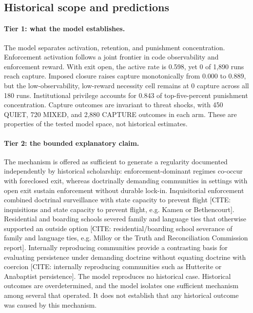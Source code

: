 \documentclass[12pt]{article}
\begin{document}
\subsection{Historical scope and predictions}

\paragraph{Tier 1: what the model establishes.}
The model separates activation, retention, and punishment concentration. Enforcement activation follows a joint frontier in code observability and enforcement reward. With exit open, the active rate is 0.598, yet 0 of 1,890 runs reach capture. Imposed closure raises capture monotonically from 0.000 to 0.889, but the low-observability, low-reward necessity cell remains at 0 capture across all 180 runs. Institutional privilege accounts for 0.843 of top-five-percent punishment concentration. Capture outcomes are invariant to threat shocks, with 450 QUIET, 720 MIXED, and 2,880 CAPTURE outcomes in each arm. These are properties of the tested model space, not historical estimates.

\paragraph{Tier 2: the bounded explanatory claim.}
The mechanism is offered as sufficient to generate a regularity documented independently by historical scholarship: enforcement-dominant regimes co-occur with foreclosed exit, whereas doctrinally demanding communities in settings with open exit sustain enforcement without durable lock-in. Inquisitorial enforcement combined doctrinal surveillance with state capacity to prevent flight [CITE: inquisitions and state capacity to prevent flight, e.g. Kamen or Bethencourt]. Residential and boarding schools severed family and language ties that otherwise supported an outside option [CITE: residential/boarding school severance of family and language ties, e.g. Milloy or the Truth and Reconciliation Commission report]. Internally reproducing communities provide a contrasting basis for evaluating persistence under demanding doctrine without equating doctrine with coercion [CITE: internally reproducing communities such as Hutterite or Anabaptist persistence]. The model reproduces no historical case. Historical outcomes are overdetermined, and the model isolates one sufficient mechanism among several that operated. It does not establish that any historical outcome was caused by this mechanism.
\end{document}

